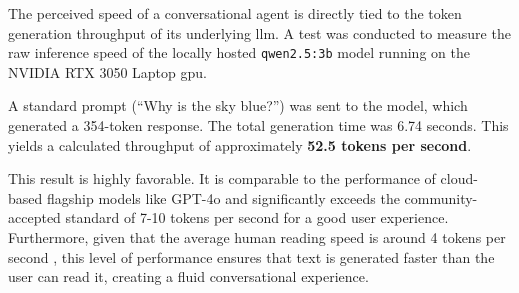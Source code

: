 The perceived speed of a conversational agent is directly tied to the token generation throughput of its underlying \ac{llm}. A test was conducted to measure the raw inference speed of the locally hosted \texttt{qwen2.5:3b} model running on the NVIDIA RTX 3050 Laptop \acs{gpu}.

A standard prompt (``Why is the sky blue?'') was sent to the model, which generated a 354-token response. The total generation time was 6.74 seconds. This yields a calculated throughput of approximately \textbf{52.5 tokens per second}.

This result is highly favorable. It is comparable to the performance of cloud-based flagship models like GPT-4o and significantly exceeds the community-accepted standard of 7-10 tokens per second for a good user experience. Furthermore, given that the average human reading speed is around 4 tokens per second \cite{READING-SPEED}, this level of performance ensures that text is generated faster than the user can read it, creating a fluid conversational experience.